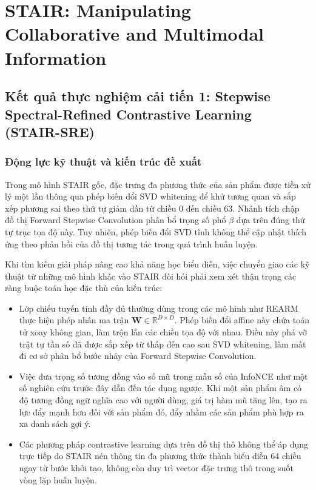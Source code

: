 \section{STAIR: Manipulating Collaborative and Multimodal Information}

\subsection{Kết quả thực nghiệm cải tiến 1: Stepwise Spectral-Refined Contrastive Learning (STAIR-SRE)}
\label{sec:stair_sre}

\subsubsection{Động lực kỹ thuật và kiến trúc đề xuất}

Trong mô hình STAIR gốc, đặc trưng đa phương thức của sản phẩm được tiền xử lý một lần thông qua phép biến đổi SVD whitening để khử tương quan và sắp xếp phương sai theo thứ tự giảm dần từ chiều 0 đến chiều 63. Nhánh tích chập đồ thị Forward Stepwise Convolution phân bổ trọng số phổ $\beta$ dựa trên đúng thứ tự trục tọa độ này. Tuy nhiên, phép biến đổi SVD tĩnh không thể cập nhật thích ứng theo phản hồi của đồ thị tương tác trong quá trình huấn luyện.

Khi tìm kiếm giải pháp nâng cao khả năng học biểu diễn, việc chuyển giao các kỹ thuật từ những mô hình khác vào STAIR đòi hỏi phải xem xét thận trọng các ràng buộc toán học đặc thù của kiến trúc:
\begin{itemize}[leftmargin=*]
    \item Lớp chiếu tuyến tính đầy đủ thường dùng trong các mô hình như REARM thực hiện phép nhân ma trận $\mathbf{W} \in \mathbb{R}^{D \times D}$. Phép biến đổi affine này chứa toán tử xoay không gian, làm trộn lẫn các chiều tọa độ với nhau. Điều này phá vỡ trật tự tần số đã được sắp xếp từ thấp đến cao sau SVD whitening, làm mất đi cơ sở phân bổ bước nhảy của Forward Stepwise Convolution.
    \item Việc đưa trọng số tương đồng vào số mũ trong mẫu số của InfoNCE như một số nghiên cứu trước đây dẫn đến tác dụng ngược. Khi một sản phẩm âm có độ tương đồng ngữ nghĩa cao với người dùng, giá trị hàm mũ tăng lên, tạo ra lực đẩy mạnh hơn đối với sản phẩm đó, đẩy nhầm các sản phẩm phù hợp ra xa danh sách gợi ý.
    \item Các phương pháp contrastive learning dựa trên đồ thị thô không thể áp dụng trực tiếp do STAIR nén thông tin đa phương thức thành biểu diễn 64 chiều ngay từ bước khởi tạo, không còn duy trì vector đặc trưng thô trong suốt vòng lặp huấn luyện.
\end{itemize}

